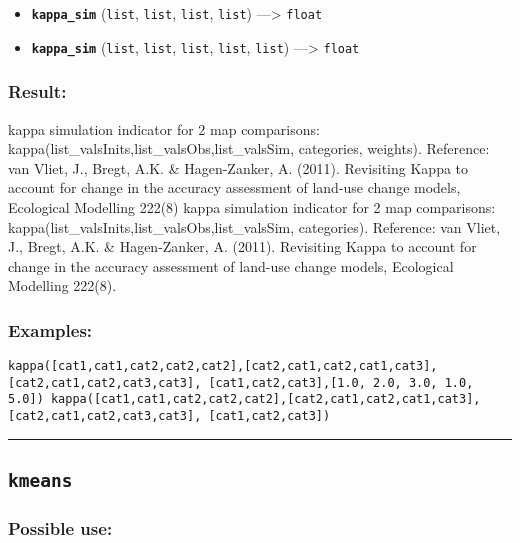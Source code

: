 \documentclass[]{book}
\providecommand{\tightlist}{%
  \setlength{\itemsep}{0pt}\setlength{\parskip}{0pt}}
\theoremstyle{definition}
\theoremstyle{definition}
\theoremstyle{definition}
\theoremstyle{remark}
\begin{document}
\begin{itemize}
\tightlist
\item
  \textbf{\texttt{kappa\_sim}} (\texttt{list}, \texttt{list},
  \texttt{list}, \texttt{list}) ---\textgreater{} \texttt{float}
\item
  \textbf{\texttt{kappa\_sim}} (\texttt{list}, \texttt{list},
  \texttt{list}, \texttt{list}, \texttt{list}) ---\textgreater{}
  \texttt{float}
\end{itemize}

\subsubsection{Result:}\label{result-302}

kappa simulation indicator for 2 map comparisons:
kappa(list\_valsInits,list\_valsObs,list\_valsSim, categories, weights).
Reference: van Vliet, J., Bregt, A.K. \& Hagen-Zanker, A. (2011).
Revisiting Kappa to account for change in the accuracy assessment of
land-use change models, Ecological Modelling 222(8) kappa simulation
indicator for 2 map comparisons:
kappa(list\_valsInits,list\_valsObs,list\_valsSim, categories).
Reference: van Vliet, J., Bregt, A.K. \& Hagen-Zanker, A. (2011).
Revisiting Kappa to account for change in the accuracy assessment of
land-use change models, Ecological Modelling 222(8).

\subsubsection{Examples:}\label{examples-219}

\begin{verbatim}
kappa([cat1,cat1,cat2,cat2,cat2],[cat2,cat1,cat2,cat1,cat3],[cat2,cat1,cat2,cat3,cat3], [cat1,cat2,cat3],[1.0, 2.0, 3.0, 1.0, 5.0]) kappa([cat1,cat1,cat2,cat2,cat2],[cat2,cat1,cat2,cat1,cat3],[cat2,cat1,cat2,cat3,cat3], [cat1,cat2,cat3]) 
\end{verbatim}

\begin{center}\rule{0.5\linewidth}{\linethickness}\end{center}

\subsection{\texorpdfstring{\texttt{kmeans}}{kmeans}}\label{kmeans}

\subsubsection{Possible use:}\label{possible-use-313}
\end{document}

